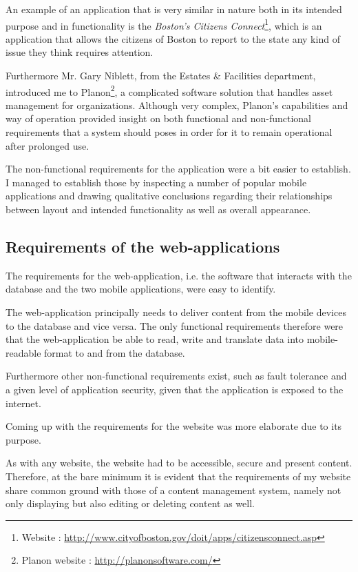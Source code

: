 \documentclass[12pt]{ecsproject}     %
\begin{document}
An example of an application that is very similar in nature both in its intended purpose and in functionality is the \emph{Boston's Citizens Connect}\footnote{Website : \href{http://www.cityofboston.gov/doit/apps/citizensconnect.asp}{http://www.cityofboston.gov/doit/apps/citizensconnect.asp}}, which is an application that allows  the citizens of Boston to report to the state any kind of issue they think requires attention.

Furthermore Mr. Gary Niblett, from the Estates \& Facilities department, introduced me to Planon\footnote{Planon website : \href{http://planonsoftware.com/}{http://planonsoftware.com/}}, a complicated software solution that handles asset management for organizations. Although very complex, Planon's capabilities and way of operation provided insight on both functional and non-functional requirements that a system should poses in order for it to remain operational after prolonged use.

The non-functional requirements for the application were a bit easier to establish. I managed to establish those by inspecting a number of popular mobile applications and drawing qualitative conclusions regarding their relationships between layout and intended functionality as well as overall appearance.

\subsection{Requirements of the web-applications}
The requirements for the web-application, i.e. the software that interacts with the database and the two mobile applications, were easy to identify.

The web-application principally needs to deliver content from the mobile devices to the database and vice versa. The only functional requirements therefore were that the web-application be able to read, write and translate data into mobile-readable format to and from the database.

Furthermore other non-functional requirements exist, such as fault tolerance and a given level of application security, given that the application is exposed to the internet.

Coming up with the requirements for the website was more elaborate due to its purpose.

As with any website, the website had to be accessible, secure and present content. Therefore, at the bare minimum it is evident that the requirements of my website share common ground with those of a content management system, namely not only displaying but also editing or deleting content as well.
\end{document}
